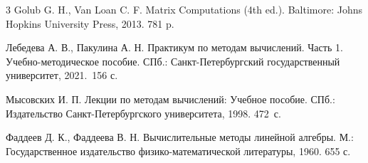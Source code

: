 \documentclass[12pt]{article}
\begin{document}
    \renewcommand{\bibname}{{Список литературы}}
    
    \begin{thebibliography}{3}
    	Golub G. H., Van Loan C. F. Matrix Computations (4th ed.). Baltimore: Johns Hopkins University Press, 2013. 781 p.
    	
        Лебедева А. В., Пакулина А. Н. Практикум по методам вычислений. Часть 1. Учебно-методическое пособие. СПб.: Санкт-Петербургский государственный университет, 2021.~156 с.
        
        Мысовских И. П. Лекции по методам вычислений: Учебное пособие. СПб.: Издательство Санкт-Петербургского университета, 1998. 472~с.
        
        Фаддеев Д. К., Фаддеева В. Н. Вычислительные методы линейной алгебры. М.:  Государственное издательство физико-математической литературы, 1960. 655 с.
    \end{thebibliography}
\end{document}
